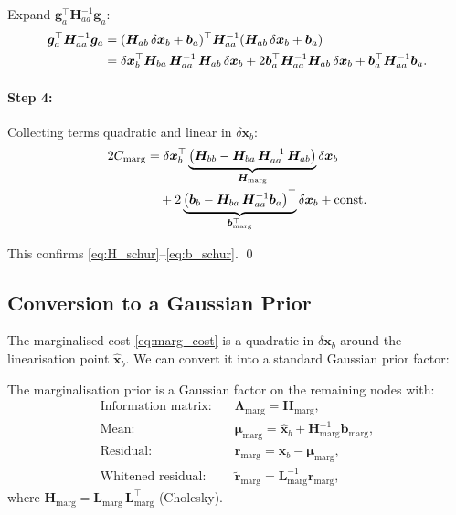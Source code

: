 \documentclass[11pt,a4paper]{article}
\newcommand{\bx}{\bm{x}}
\newcommand{\br}{\bm{r}}
\newcommand{\bb}{\bm{b}}
\newcommand{\bH}{\bm{H}}
\newcommand{\bLambda}{\bm{\Lambda}}
\theoremstyle{definition}
\theoremstyle{plain}
\begin{document}
Expand $\bm{g}_a^\top \bH_{aa}^{-1}\bm{g}_a$:
\begin{align}
  \bm{g}_a^\top \bH_{aa}^{-1}\bm{g}_a
    &= (\bH_{ab}\,\delta\bx_b + \bb_a)^\top
       \bH_{aa}^{-1}
       (\bH_{ab}\,\delta\bx_b + \bb_a) \notag \\
    &= \delta\bx_b^\top \bH_{ba}\,\bH_{aa}^{-1}\,\bH_{ab}\,\delta\bx_b
       + 2\bb_a^\top \bH_{aa}^{-1}\bH_{ab}\,\delta\bx_b
       + \bb_a^\top \bH_{aa}^{-1}\bb_a.
\end{align}

\paragraph{Step 4:} Collecting terms quadratic and linear in $\delta\bx_b$:
\begin{align}
  2C_{\text{marg}} &= \delta\bx_b^\top
    \underbrace{\bigl(\bH_{bb} - \bH_{ba}\,\bH_{aa}^{-1}\,\bH_{ab}\bigr)}_{\bH_{\text{marg}}}
    \delta\bx_b \notag \\
    &\quad + 2\underbrace{\bigl(\bb_b - \bH_{ba}\,\bH_{aa}^{-1}\bb_a\bigr)^\top}_{\bb_{\text{marg}}^\top}
    \delta\bx_b + \text{const.}
\end{align}

This confirms \eqref{eq:H_schur}--\eqref{eq:b_schur}. \qed

\subsection{Conversion to a Gaussian Prior}

The marginalised cost \eqref{eq:marg_cost} is a quadratic in $\delta\bx_b$
around the linearisation point $\hat{\bx}_b$.  We can convert it into a
standard Gaussian prior factor:

\begin{keybox}
The marginalisation prior is a Gaussian factor on the remaining nodes with:
\begin{align}
  \text{Information matrix:}& \quad \bLambda_{\text{marg}} = \bH_{\text{marg}},
  \label{eq:marg_info} \\[3pt]
  \text{Mean:}& \quad \bm{\mu}_{\text{marg}} = \hat{\bx}_b + \bH_{\text{marg}}^{-1}\bb_{\text{marg}},
  \label{eq:marg_mean} \\[3pt]
  \text{Residual:}& \quad \br_{\text{marg}} = \bx_b - \bm{\mu}_{\text{marg}},
  \label{eq:marg_residual} \\[3pt]
  \text{Whitened residual:}& \quad \tilde{\br}_{\text{marg}} = \bm{L}_{\text{marg}}^{-1}\br_{\text{marg}},
  \label{eq:marg_whitened}
\end{align}
where $\bH_{\text{marg}} = \bm{L}_{\text{marg}}\,\bm{L}_{\text{marg}}^\top$ (Cholesky).
\end{keybox}
\end{document}
